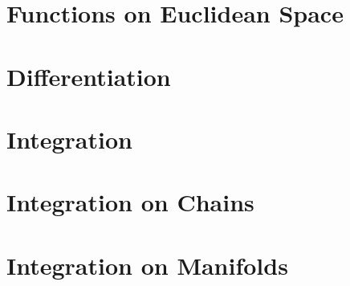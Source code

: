 \documentclass[12pt]{book}
\begin{document}
\frontmatter



\large      %






\chapter{Functions on Euclidean Space}




\chapter{Differentiation}








\chapter{Integration}







\chapter{Integration on Chains}





\chapter{Integration on Manifolds}







\backmatter



\end{document}
